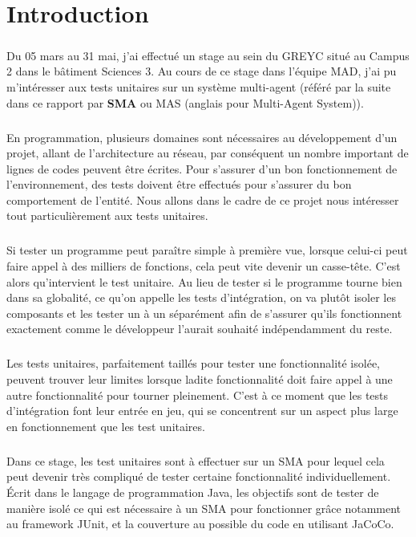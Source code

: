 \chapter{Introduction}

\paragraph{}
Du 05 mars au 31 mai, j'ai effectué un stage au sein du GREYC situé au Campus 2 dans le bâtiment Sciences 3. Au cours de ce stage dans l'équipe MAD, j'ai pu m'intéresser aux tests unitaires sur un système multi-agent (référé par la suite dans ce rapport par \textbf{SMA} ou MAS (anglais pour Multi-Agent System)).
\paragraph{}
En programmation, plusieurs domaines sont nécessaires au développement d'un projet, allant de l'architecture au réseau, par conséquent un nombre important de lignes de codes peuvent être écrites. Pour s'assurer d'un bon fonctionnement de l'environnement, des tests doivent être effectués pour s'assurer du bon comportement de l'entité. Nous allons dans le cadre de ce projet nous intéresser tout particulièrement aux tests unitaires.
\paragraph{}
Si tester un programme peut paraître simple à première vue, lorsque celui-ci peut faire appel à des milliers de fonctions, cela peut vite devenir un casse-tête. C'est alors qu'intervient le test unitaire. Au lieu de tester si le programme tourne bien dans sa globalité, ce qu'on appelle les tests d'intégration, on va plutôt isoler les composants et les tester un à un séparément afin de s'assurer qu'ils fonctionnent exactement comme le développeur l'aurait souhaité indépendamment du reste.
\paragraph{}
Les tests unitaires, parfaitement taillés pour tester une fonctionnalité isolée, peuvent trouver leur limites lorsque ladite fonctionnalité doit faire appel à une autre fonctionnalité pour tourner pleinement. C'est à ce moment que les tests d'intégration font leur entrée en jeu, qui se concentrent sur un aspect plus large en fonctionnement que les test unitaires.
\paragraph{}
Dans ce stage, les test unitaires sont à effectuer sur un SMA pour lequel cela peut devenir très compliqué de tester certaine fonctionnalité individuellement.
Écrit dans le langage de programmation Java, les objectifs sont de tester de manière isolé ce qui est nécessaire à un SMA pour fonctionner grâce notamment au framework JUnit, et la couverture au possible du code en utilisant JaCoCo.

